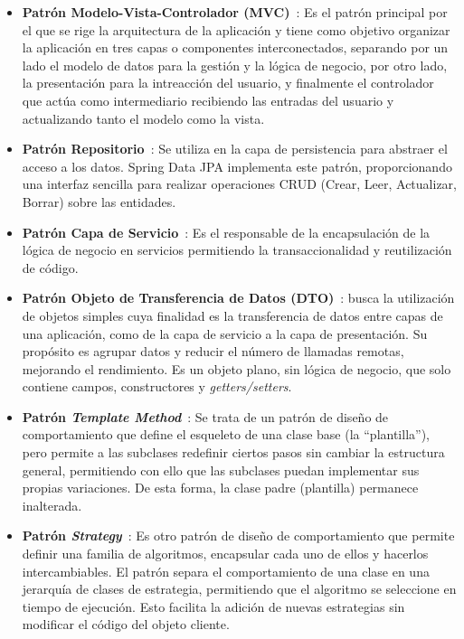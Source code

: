 \begin{itemize}
    \item \textbf{Patrón Modelo-Vista-Controlador (MVC)}~\cite{patron-mvc}: Es el patrón principal por el que se rige la arquitectura de la aplicación y tiene como objetivo organizar la aplicación en tres capas o componentes interconectados, separando por un lado el modelo de datos para la gestión y la lógica de negocio, por otro lado, la presentación para la intreacción del usuario, y finalmente el controlador que actúa como intermediario recibiendo las entradas del usuario y actualizando tanto el modelo como la vista.
    \item \textbf{Patrón Repositorio}~\cite{patron-repository}: Se utiliza en la capa de persistencia para abstraer el acceso a los datos. Spring Data JPA implementa este patrón, proporcionando una interfaz sencilla para realizar operaciones CRUD (Crear, Leer, Actualizar, Borrar) sobre las entidades.
    \item \textbf{Patrón Capa de Servicio}~\cite{patron-service}: Es el responsable de la encapsulación de la lógica de negocio en servicios permitiendo la transaccionalidad y reutilización de código.
    \item \textbf{Patrón Objeto de Transferencia de Datos (DTO)}~\cite{patron-dto}: busca la utilización de objetos simples cuya finalidad es la transferencia de datos entre capas de una aplicación, como de la capa de servicio a la capa de presentación. Su propósito es agrupar datos y reducir el número de llamadas remotas, mejorando el rendimiento. Es un objeto plano, sin lógica de negocio, que solo contiene campos, constructores y \emph{getters/setters}.
    \item \textbf{Patrón \emph{Template Method}}~\cite{patron-template}: Se trata de un patrón de diseño de comportamiento que define el esqueleto de una clase base (la ``plantilla''), pero permite a las subclases redefinir ciertos pasos sin cambiar la estructura general, permitiendo con ello que las subclases puedan implementar sus propias variaciones. De esta forma, la clase padre (plantilla) permanece inalterada.
    \item \textbf{Patrón \emph{Strategy}}~\cite{patron-strategy}: Es otro patrón de diseño de comportamiento que permite definir una familia de algoritmos, encapsular cada uno de ellos y hacerlos intercambiables. El patrón separa el comportamiento de una clase en una jerarquía de clases de estrategia, permitiendo que el algoritmo se seleccione en tiempo de ejecución. Esto facilita la adición de nuevas estrategias sin modificar el código del objeto cliente.
\end{itemize}

